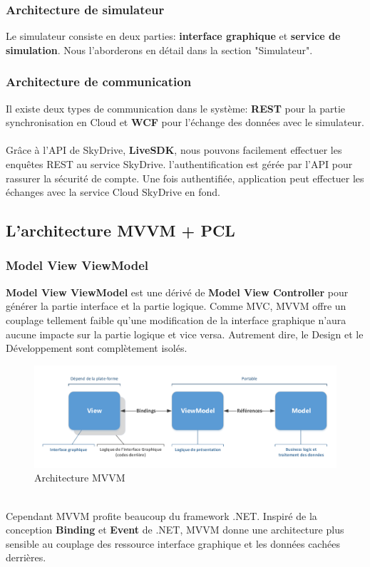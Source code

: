 \documentclass{article}
\begin{document}
\vspace{0.2 cm}
\subsubsection{\large Architecture de simulateur}
Le simulateur consiste en deux parties: \textbf{interface graphique} et \textbf{service de simulation}. Nous l'aborderons en détail dans la section "Simulateur".

\vspace{0.2 cm}
\subsubsection{\large Architecture de communication}
Il existe deux types de communication dans le système:  \textbf{REST} pour la partie synchronisation en Cloud et \textbf{WCF} pour l'échange des données avec le simulateur.
\\\\
Grâce à l'API de SkyDrive, \textbf{LiveSDK}, nous pouvons facilement effectuer les enquêtes REST au service SkyDrive. l'authentification est gérée par l'API pour rassurer la sécurité de compte. Une fois authentifiée, application peut effectuer les échanges avec la service Cloud SkyDrive en fond.

\vspace{0.2 cm}
\subsection{\Large L'architecture MVVM + PCL}

\vspace{0.2 cm}
\subsubsection{\large Model View ViewModel}
\textbf{Model View ViewModel} est une dérivé de \textbf{Model View Controller} pour générer la partie interface et la partie logique. Comme MVC, MVVM offre un couplage tellement faible qu'une modification de la interface graphique n'aura aucune impacte sur la partie logique et vice versa. Autrement dire, le Design et le Développement sont complètement isolés. 

\begin{figure}[h!]
\centering
\includegraphics[width=150mm]{MVVM.pdf}
\caption{Architecture MVVM}
\end{figure}
\ \\Cependant MVVM profite beaucoup du framework .NET. Inspiré de la conception \textbf{Binding} et \textbf{Event} de .NET, MVVM donne une architecture plus sensible au couplage des ressource interface graphique et les données cachées derrières. 
\end{document}
